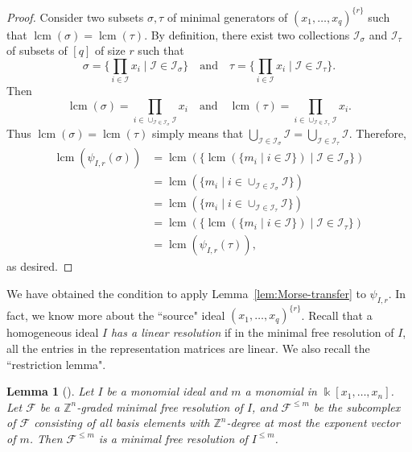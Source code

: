 \documentclass[reqno]{amsart}
\DeclareMathOperator{\lcm}{lcm}
\newtheorem{lemma}[theorem]{Lemma}
\theoremstyle{definition}
\theoremstyle{remark}
\numberwithin{equation}{section}
\begin{document}
\begin{proof}
    Consider two subsets $\sigma,\tau$ of minimal generators of $(x_1,\dots, x_q)^{\{r\}}$ such that $\lcm(\sigma)=\lcm(\tau)$. By definition,  there exist two collections $\mathcal{I}_\sigma$ and $\mathcal{I}_\tau$ of subsets of $[q]$ of size $r$ such that 
    \[
    \sigma = \{ \prod_{i\in \mathcal{I}} x_i \mid \mathcal{I} \in \mathcal{I}_\sigma \} \quad \text{and} \quad \tau = \{ \prod_{i\in \mathcal{I}} x_i \mid \mathcal{I} \in \mathcal{I}_\tau \}. 
    \]
    Then 
    \[
    \lcm(\sigma) = \prod_{i\in \cup_{\mathcal{I}\in \mathcal{I}_\sigma} \mathcal{I{}}} x_i \quad \text{and} \quad \lcm(\tau) = \prod_{i\in \cup_{\mathcal{I}\in \mathcal{I}_\tau} \mathcal{I{}}} x_i. 
    \]
    Thus $\lcm(\sigma)=\lcm(\tau)$ simply means that $\bigcup_{\mathcal{I}\in \mathcal{I}_\sigma} \mathcal{I} = \bigcup_{\mathcal{I}\in \mathcal{I}_\tau} \mathcal{I}$. Therefore,
    \begin{align*}
        \lcm(\psi_{I,r}(\sigma)) &= \lcm(\{ \lcm(\{m_i\mid i\in \mathcal{I}\}) \mid \mathcal{I}\in \mathcal{I}_\sigma  \})\\
        &= \lcm(\{m_i\mid i\in \cup_{\mathcal{I\in \mathcal{I}_\sigma}} \mathcal{I}\})\\
        &= \lcm(\{m_i\mid i\in \cup_{\mathcal{I\in \mathcal{I}_\tau}} \mathcal{I}\})\\
        &= \lcm(\{ \lcm(\{m_i\mid i\in \mathcal{I}\}) \mid \mathcal{I}\in \mathcal{I}_\tau  \})\\
        &=\lcm(\psi_{I,r}(\tau)),
    \end{align*}
    as desired.
\end{proof}

We have obtained the condition to apply Lemma~\ref{lem:Morse-transfer} to $\psi_{I,r}$. In fact, we know more about the ``source" ideal $(x_1,\dots, x_q)^{\{r\}}$. Recall that a homogeneous ideal $I$ \emph{has a linear resolution} if in the minimal free resolution of $I$, all the entries in the representation matrices are linear. We also recall the ``restriction lemma".

\begin{lemma}[]\label{lem:restriction}
    Let $I$ be a monomial ideal and $m$ a monomial  in $\Bbbk[x_1,\dots, x_n]$. Let $\mathcal{F}$ be a $\mathbb{Z}^n$-graded minimal free resolution of $I$, and $\mathcal{F}^{\leq m}$ be the subcomplex of $\mathcal{F}$ consisting of all basis elements with $\mathbb{Z}^n$-degree at most the exponent vector of $m$. Then $\mathcal{F}^{\leq m}$ is a minimal free resolution of $I^{\leq m}$.
\end{lemma}
\end{document}
